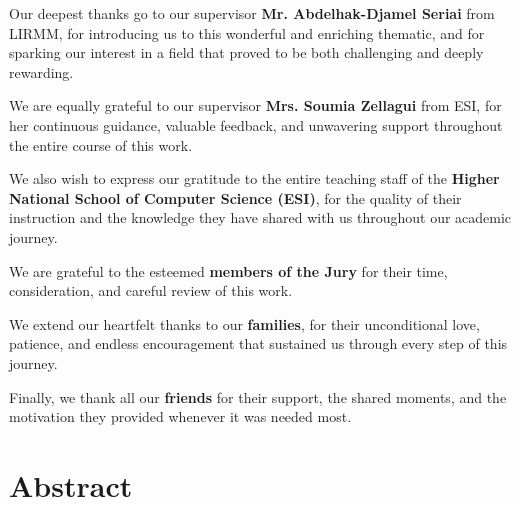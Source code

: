 \documentclass[11pt,a4paper]{report}
\begin{document}
\vspace{0.4cm}

\noindent Our deepest thanks go to our supervisor \textbf{Mr. Abdelhak-Djamel Seriai}
from LIRMM, for introducing us to this wonderful and enriching thematic, and for sparking
our interest in a field that proved to be both challenging and deeply rewarding.

\vspace{0.4cm}

\noindent We are equally grateful to our supervisor \textbf{Mrs. Soumia Zellagui} from ESI,
for her continuous guidance, valuable feedback, and unwavering support throughout the entire
course of this work.

\vspace{0.4cm}

\noindent We also wish to express our gratitude to the entire teaching staff of the
\textbf{Higher National School of Computer Science (ESI)}, for the quality of their
instruction and the knowledge they have shared with us throughout our academic journey.

\vspace{0.4cm}

\noindent We are grateful to the esteemed \textbf{members of the Jury} for their time,
consideration, and careful review of this work.

\vspace{0.4cm}

\noindent We extend our heartfelt thanks to our \textbf{families}, for their unconditional
love, patience, and endless encouragement that sustained us through every step of this journey.

\vspace{0.4cm}

\noindent Finally, we thank all our \textbf{friends} for their support, the shared moments,
and the motivation they provided whenever it was needed most.

\vspace{1cm}


\chapter*{Abstract}
\end{document}

